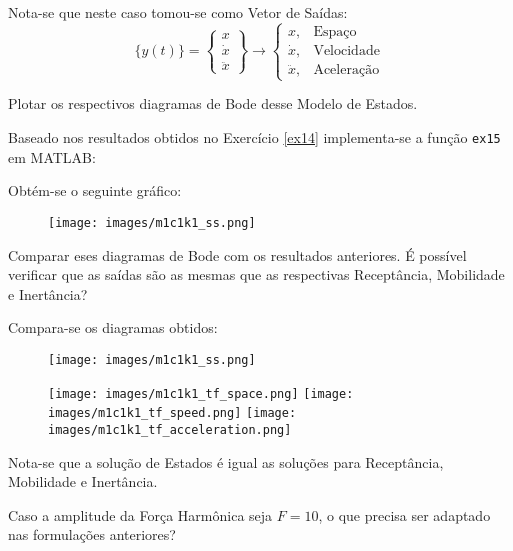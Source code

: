 \documentclass{article}
\begin{document}
\begin{resolution}
\begin{equation*}
    \end{equation*}
    Nota-se que neste caso tomou-se como Vetor de Saídas:
    \begin{equation*}
        \lbrace y(t) \rbrace = \begin{Bmatrix} x\\ \dot{x}\\ \ddot{x} \end{Bmatrix} 
        \to \begin{cases} x, &\text{Espaço}\\ \dot{x},&\text{Velocidade}\\ \ddot{x},&\text{Aceleração} \end{cases}
    \end{equation*}
\end{resolution}

\newpage
\begin{exercise}\label{ex15}
    Plotar os respectivos diagramas de Bode desse Modelo de Estados.
\end{exercise}
\begin{resolution}
    Baseado nos resultados obtidos no Exercício \ref{ex14} implementa-se a função \texttt{ex15} em MATLAB:
    \begin{scriptsize}
        \myMatlab
    \end{scriptsize}
    Obtém-se o seguinte gráfico:
    \begin{figure}[H]
        \centering
        \texttt{[image: images/m1c1k1\_ss.png]}
    \end{figure}
\end{resolution}

\newpage
\begin{exercise}\label{ex16}
    Comparar eses diagramas de Bode com os resultados anteriores. É possível verificar que as saídas são as mesmas que as respectivas Receptância, Mobilidade e Inertância?
\end{exercise}
\begin{resolution}
    Compara-se os diagramas obtidos:
    \begin{figure}[H]
        \centering
        \texttt{[image: images/m1c1k1\_ss.png]}
    \end{figure}
    \begin{figure}[H]
        \centering
        \texttt{[image: images/m1c1k1\_tf\_space.png]}
        \texttt{[image: images/m1c1k1\_tf\_speed.png]}
        \texttt{[image: images/m1c1k1\_tf\_acceleration.png]}
    \end{figure}
    Nota-se que a solução de Estados é igual as soluções para Receptância, Mobilidade e Inertância.
\end{resolution}

\newpage
\begin{exercise}\label{ex17}
    Caso a amplitude da Força Harmônica seja $F = 10$, o que precisa ser adaptado nas formulações anteriores?
\end{exercise}
\end{document}
